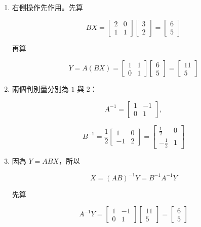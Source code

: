\documentclass[11pt,a4paper]{article}
\begin{document}
\begin{enumerate}
\def\labelenumi{\arabic{enumi}.}
\item
  右側操作先作用。先算

  \[
  BX=\begin{bmatrix}2&0\\1&1\end{bmatrix}
  \begin{bmatrix}3\\2\end{bmatrix}
  =\begin{bmatrix}6\\5\end{bmatrix}
  \]

  再算

  \[
  Y=A(BX)
  =\begin{bmatrix}1&1\\0&1\end{bmatrix}
  \begin{bmatrix}6\\5\end{bmatrix}
  =\begin{bmatrix}11\\5\end{bmatrix}
  \]
\item
  兩個判別量分別為 \(1\) 與 \(2\)：

  \[
  A^{-1}=\begin{bmatrix}1&-1\\0&1\end{bmatrix},
  \]

  \[
  B^{-1}=\frac12\begin{bmatrix}1&0\\-1&2\end{bmatrix}
  =\begin{bmatrix}\frac12&0\\-\frac12&1\end{bmatrix}
  \]
\item
  因為 \(Y=ABX\)，所以

  \[
  X=(AB)^{-1}Y=B^{-1}A^{-1}Y
  \]

  先算

  \[
  A^{-1}Y
  =\begin{bmatrix}1&-1\\0&1\end{bmatrix}
  \begin{bmatrix}11\\5\end{bmatrix}
  =\begin{bmatrix}6\\5\end{bmatrix}
  \]


\end{enumerate}
\end{document}
